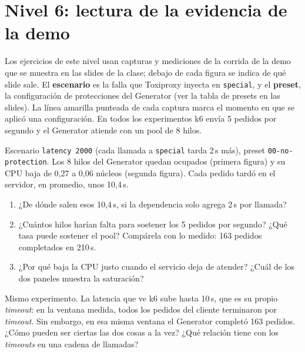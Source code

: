\documentclass[variant=guia,cover=institutional,mode=screen]{ua-engineering-v6-article}
\begin{document}
\section{Nivel 6: lectura de la evidencia de la demo}
Los ejercicios de este nivel usan capturas y mediciones de la corrida de la demo que se muestra en las slides de la clase; debajo de cada figura se indica de qué slide sale. El \textbf{escenario} es la falla que Toxiproxy inyecta en \texttt{special}, y el \textbf{preset}, la configuración de protecciones del Generator (ver la tabla de presets en las slides). La línea amarilla punteada de cada captura marca el momento en que se aplicó una configuración. En todos los experimentos k6 envía 5 pedidos por segundo y el Generator atiende con un pool de 8 hilos.

\begin{uaexercise}
Escenario \texttt{latency 2000} (cada llamada a \texttt{special} tarda 2\,s más), preset \texttt{00-no-protection}. Los 8 hilos del Generator quedan ocupados (primera figura) y su CPU baja de 0,27 a 0,06 núcleos (segunda figura). Cada pedido tardó en el servidor, en promedio, unos 10,4\,s.
\begin{enumerate}
\item ¿De dónde salen esos 10,4\,s, si la dependencia solo agrega 2\,s por llamada?
\item ¿Cuántos hilos harían falta para sostener los 5 pedidos por segundo? ¿Qué tasa puede sostener el pool? Compárela con lo medido: 163 pedidos completados en 210\,s.
\item ¿Por qué baja la CPU justo cuando el servicio deja de atender? ¿Cuál de los dos paneles muestra la saturación?
\end{enumerate}
\end{uaexercise}

\begin{uaexercise}
Mismo experimento. La latencia que ve k6 sube hasta 10\,s, que es su propio \emph{timeout}: en la ventana medida, todos los pedidos del cliente terminaron por \emph{timeout}. Sin embargo, en esa misma ventana el Generator completó 163 pedidos.
¿Cómo pueden ser ciertas las dos cosas a la vez? ¿Qué relación tiene con los \emph{timeouts} en una cadena de llamadas?
\end{uaexercise}
\end{document}
